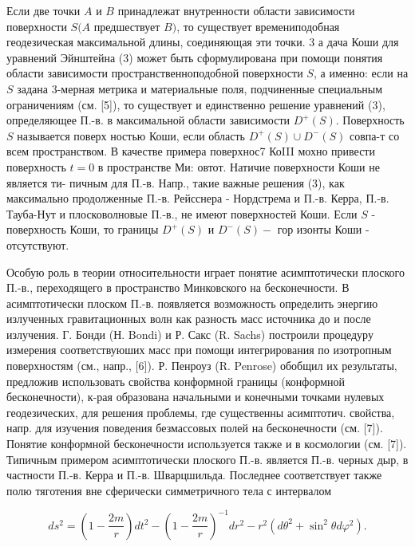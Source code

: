 \documentclass[10pt]{article}
\begin{document}
Если две точки $A$ и $B$ принадлежат внутренности области зависимости поверхности $S(A$ предшествует $B)$, то существует времениподобная геодезическая максимальной длины, соединяющая эти точки. 3 а дача Коши для уравнений Эйнштейна (3) может быть сформулирована при помощи понятия области зависимости пространственноподобной поверхности $S$, а именно: если на $S$ задана 3-мерная метрика и материальные поля, подчиненные специальным ограничениям (см. [5]), то существует и единственно решение уравнений (3), определяющее П.-в. в максимальной области зависимости $D^{+}(S)$. Поверхность $S$ называется поверх ностью Коши, если область $D^{+}(S) \cup D^{-}(S)$ совпа-т со всем пространством. В качестве примера поверхнос7 КоIII мохно привести поверхность $t=0$ в пространстве Ми: овтот. Натичие поверхности Коши не является ти- пичным для П.-в. Напр., такие важные решения (3), как максимально продолженные П.-в. Рейсснера - Нордстрема и П.-в. Керра, П.-в. Тауба-Нут и плосковолновые П.-в., не имеют поверхностей Коши. Если $S$ - поверхность Коши, то границы $D^{+}(S)$ и $D^{-}(S)-$ гор изонты Коши - отсутствуют.



Особую роль в теории относительности играет понятие асимптотически плоского П.-в., переходящего в пространство Минковского на бесконечности. В асимптотически плоском П.-в. появляется возможность определить энергию излученных гравитационных волн как разность масс источника до и после излучения. Г. Бонди (Н. Bondi) и Р. Сакс (R. Sachs) построили процедуру измерения соответствуюших масс при помощи интегрирования по изотропным поверхностям (см., напр., [6]). Р. Пенроуз (R. Penrose) обобщил их результаты, предложив использовать свойства конформной границы (конформной бесконечности), к-рая образована начальными и конечными точками нулевых геодезических, для решения проблемы, где существенны асимптотич. свойства, напр. для изучения поведения безмассовых полей на бесконечности (см. [7]). Понятие конформной бесконечности используется также и в космологии (см. [7]). Типичным примером асимптотически плоского П.-в. является П.-в. черных дыр, в частности П.-в. Керра и П.-в. Шварцшильда. Последнее соответствует также полю тяготения вне сферически симметричного тела с интервалом



\[

d s^{2}=\left(1-\frac{2 m}{r}\right) d t^{2}-\left(1-\frac{2 m}{r}\right)^{-1} d r^{2}-r^{2}\left(d \theta^{2}+\sin ^{2} \theta d \varphi^{2}\right) .

\]
\end{document}
